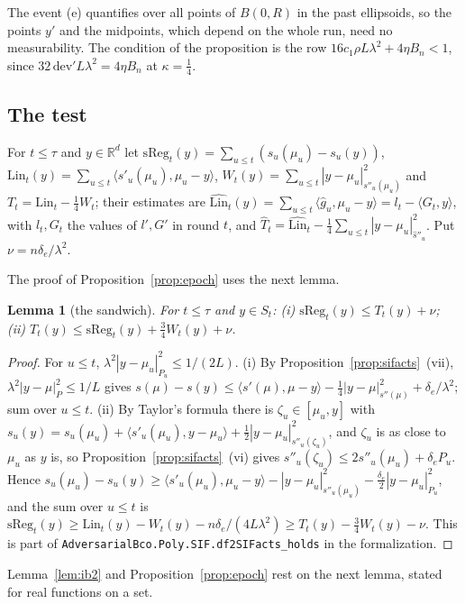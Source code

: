 \documentclass[11pt]{amsart}
\newtheorem{lemma}[theorem]{Lemma}
\theoremstyle{definition}
\numberwithin{equation}{section}
\newcommand{\R}{\mathbb{R}}
\newcommand{\ip}[1]{\langle #1\rangle}
\begin{document}
The event (e) quantifies over all points of $B(0,R)$ in the past ellipsoids, so the points $y'$ and the midpoints, which depend on the whole run, need no measurability. The condition of the proposition is the row $16c_1\rho L\lambda^2+4\eta B_n<1$, since $32\,\mathrm{dev}'L\lambda^2=4\eta B_n$ at $\kappa=\frac14$.

\subsection{The test}\label{app:epoch-test}

For $t\le\tau$ and $y\in\R^d$ let $\mathrm{sReg}_t(y)=\sum_{u\le t}(s_u(\mu_u)-s_u(y))$, $\mathrm{Lin}_t(y)=\sum_{u\le t}\ip{s'_u(\mu_u),\mu_u-y}$, $W_t(y)=\sum_{u\le t}|y-\mu_u|^2_{s''_u(\mu_u)}$ and $T_t=\mathrm{Lin}_t-\frac14W_t$; their estimates are $\widehat{\mathrm{Lin}}_t(y)=\sum_{u\le t}\ip{\hat g_u,\mu_u-y}=l_t-\ip{G_t,y}$, with $l_t,G_t$ the values of $l',G'$ in round $t$, and $\hat T_t=\widehat{\mathrm{Lin}}_t-\frac14\sum_{u\le t}|y-\mu_u|^2_{\hat s''_u}$. Put $\nu=n\delta_e/\lambda^2$.

The proof of Proposition~\ref{prop:epoch} uses the next lemma.

\begin{lemma}[the sandwich]\label{lem:sandwich}
For $t\le\tau$ and $y\in S_t$: (i) $\mathrm{sReg}_t(y)\le T_t(y)+\nu$; (ii) $T_t(y)\le\mathrm{sReg}_t(y)+\frac34W_t(y)+\nu$.
\end{lemma}

\begin{proof}
For $u\le t$, $\lambda^2|y-\mu_u|^2_{P_u}\le1/(2L)$. (i) By Proposition~\ref{prop:sifacts}~(vii), $\lambda^2|y-\mu|^2_P\le1/L$ gives $s(\mu)-s(y)\le\ip{s'(\mu),\mu-y}-\frac14|y-\mu|^2_{s''(\mu)}+\delta_e/\lambda^2$; sum over $u\le t$. (ii) By Taylor's formula there is $\zeta_u\in[\mu_u,y]$ with $s_u(y)=s_u(\mu_u)+\ip{s'_u(\mu_u),y-\mu_u}+\frac12|y-\mu_u|^2_{s''_u(\zeta_u)}$, and $\zeta_u$ is as close to $\mu_u$ as $y$ is, so Proposition~\ref{prop:sifacts}~(vi) gives $s''_u(\zeta_u)\le2s''_u(\mu_u)+\delta_eP_u$. Hence $s_u(\mu_u)-s_u(y)\ge\ip{s'_u(\mu_u),\mu_u-y}-|y-\mu_u|^2_{s''_u(\mu_u)}-\frac{\delta_e}2|y-\mu_u|^2_{P_u}$, and the sum over $u\le t$ is $\mathrm{sReg}_t(y)\ge\mathrm{Lin}_t(y)-W_t(y)-n\delta_e/(4L\lambda^2)\ge T_t(y)-\frac34W_t(y)-\nu$.
This is part of \texttt{AdversarialBco.Poly.SIF.df2SIFacts\_holds} in the formalization.
\end{proof}

Lemma~\ref{lem:ib2} and Proposition~\ref{prop:epoch} rest on the next lemma, stated for real functions on a set.
\end{document}

